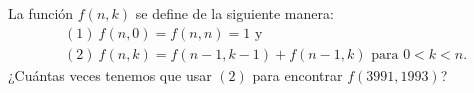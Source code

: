 La función $f(n,k)$ se define de la siguiente manera:
\begin{align*}
  &(1)\ f(n,0)= f(n,n) = 1 \text{ y }  \\
  &(2)\ f(n,k)= f(n-1,k-1) + f(n-1,k)\text{ para }0 < k < n.
\end{align*}
¿Cuántas veces tenemos que usar $(2)$ para encontrar $f(3991,1993)$?